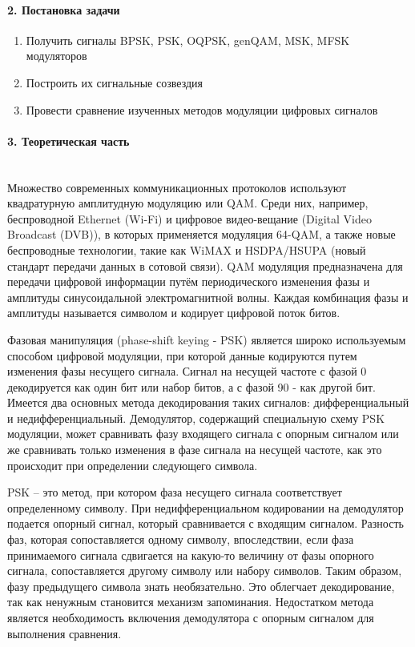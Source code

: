 \documentclass[12pt,a4paper]{report}
\begin{document}
\paragraph{2. Постановка задачи\\}
\begin{enumerate}
\item Получить сигналы BPSK, PSK, OQPSK, genQAM, MSK, MFSK
модуляторов
\item Построить их сигнальные созвездия
\item Провести сравнение изученных методов модуляции цифровых
сигналов
\end{enumerate}

\paragraph{3. Теоретическая часть \\\\}
Множество современных коммуникационных протоколов используют квадратурную амплитудную модуляцию или QAM. Среди них, например, беспроводной Ethernet (Wi-Fi) и цифровое видео-вещание (Digital Video Broadcast (DVB)), в которых применяется модуляция 64-QAM, а также новые беспроводные технологии, такие как WiMAX и HSDPA/HSUPA (новый стандарт передачи данных в сотовой связи). QAM модуляция предназначена для передачи цифровой информации путём периодического изменения фазы и амплитуды синусоидальной электромагнитной волны. Каждая комбинация фазы и амплитуды называется символом и кодирует цифровой поток битов.

Фазовая манипуляция (phase-shift keying - PSK) является широко используемым способом цифровой модуляции, при которой данные кодируются путем изменения фазы несущего сигнала. Сигнал на несущей частоте с фазой 0 декодируется как один бит или набор битов, а с фазой 90 - как другой бит. Имеется два основных метода декодирования таких сигналов: дифференциальный и недифференциальный. Демодулятор, содержащий специальную схему PSK модуляции, может сравнивать фазу входящего сигнала с опорным сигналом или же сравнивать только изменения в фазе сигнала на несущей частоте, как это происходит при определении следующего символа.

PSK – это метод, при котором фаза несущего сигнала соответствует определенному символу. При недифференциальном кодировании на демодулятор подается опорный сигнал, который сравнивается с входящим сигналом. Разность фаз, которая сопоставляется одному символу, впоследствии, если фаза принимаемого сигнала сдвигается на какую-то величину от фазы опорного сигнала, сопоставляется другому символу или набору символов. Таким образом, фазу предыдущего символа знать необязательно. Это облегчает декодирование, так как ненужным становится механизм запоминания. Недостатком метода является необходимость включения демодулятора с опорным сигналом для выполнения сравнения.
\end{document}
